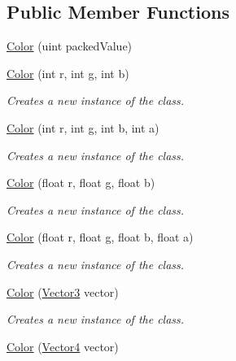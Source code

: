 \subsection*{Public Member Functions}
\begin{DoxyCompactItemize}
\item 
\hyperlink{struct_microsoft_1_1_xna_1_1_framework_1_1_color_afb00693a936110cf49ba0ba9454cb254}{Color} (uint packed\+Value)
\item 
\hyperlink{struct_microsoft_1_1_xna_1_1_framework_1_1_color_a36776c9dcf38442698f59b09f5d4e58c}{Color} (int r, int g, int b)
\begin{DoxyCompactList}\small\item\em Creates a new instance of the class.\end{DoxyCompactList}\item 
\hyperlink{struct_microsoft_1_1_xna_1_1_framework_1_1_color_a0cea09fd5edb47275d820718e5da98bd}{Color} (int r, int g, int b, int a)
\begin{DoxyCompactList}\small\item\em Creates a new instance of the class.\end{DoxyCompactList}\item 
\hyperlink{struct_microsoft_1_1_xna_1_1_framework_1_1_color_a4dd792a9ce68a9bfd85c1b1971530a56}{Color} (float r, float g, float b)
\begin{DoxyCompactList}\small\item\em Creates a new instance of the class.\end{DoxyCompactList}\item 
\hyperlink{struct_microsoft_1_1_xna_1_1_framework_1_1_color_a2745e1f8d2e3e503fccd81148a264e74}{Color} (float r, float g, float b, float a)
\begin{DoxyCompactList}\small\item\em Creates a new instance of the class.\end{DoxyCompactList}\item 
\hyperlink{struct_microsoft_1_1_xna_1_1_framework_1_1_color_aa1e64b506dafc4a68dea3c913dadaad7}{Color} (\hyperlink{struct_microsoft_1_1_xna_1_1_framework_1_1_vector3}{Vector3} vector)
\begin{DoxyCompactList}\small\item\em Creates a new instance of the class.\end{DoxyCompactList}\item 
\hyperlink{struct_microsoft_1_1_xna_1_1_framework_1_1_color_a1300009d2d734d1e28e03ef1af848486}{Color} (\hyperlink{struct_microsoft_1_1_xna_1_1_framework_1_1_vector4}{Vector4} vector)

\end{DoxyCompactItemize}
